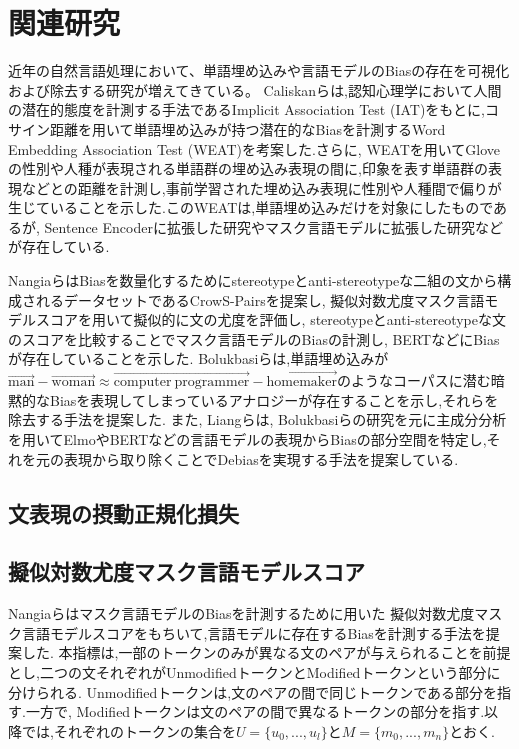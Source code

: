 \documentclass[
  platex, dvipdfmx %
]{nlp2021}
\begin{document}
\section{関連研究}
近年の自然言語処理において、単語埋め込みや言語モデルのBiasの存在を可視化および除去する研究が増えてきている。
Caliskanら\cite{caliskan2017}は,認知心理学において人間の潜在的態度を計測する手法であるImplicit Association Test (IAT)\cite{Greenwald98measuringindividual}をもとに,コサイン距離を用いて単語埋め込みが持つ潜在的なBiasを計測するWord Embedding Association Test (WEAT)を考案した.さらに, WEATを用いてGlove\cite{pennington2014glove}の性別や人種が表現される単語群の埋め込み表現の間に,印象を表す単語群の表現などとの距離を計測し,事前学習された埋め込み表現に性別や人種間で偏りが生じていることを示した.このWEATは,単語埋め込みだけを対象にしたものであるが, Sentence Encoderに拡張した研究\cite{may-etal-2019-measuring}やマスク言語モデルに拡張した研究\cite{kurita2019measuring}などが存在している.

Nangiaら\cite{nangia2020crows}はBiasを数量化するためにstereotypeとanti-stereotypeな二組の文から構成されるデータセットであるCrowS-Pairsを提案し, 擬似対数尤度マスク言語モデルスコア\cite{salazar-etal-2020-masked}を用いて擬似的に文の尤度を評価し,  stereotypeとanti-stereotypeな文のスコアを比較することでマスク言語モデルのBiasの計測し, BERTなどにBiasが存在していることを示した.
Bolukbasiら\cite{bolukbasi2016man}は,単語埋め込みが$\overrightarrow{\mathrm{man}}-\overrightarrow{\mathrm{woman}} \approx \overrightarrow{\mathrm{computer\ programmer}}-\overrightarrow{\mathrm{homemaker}}$のようなコーパスに潜む暗黙的なBiasを表現してしまっているアナロジーが存在することを示し,それらを除去する手法を提案した.
また, Liangら\cite{liang-etal-2020-towards}は, Bolukbasiらの研究を元に主成分分析を用いてElmoやBERTなどの言語モデルの表現からBiasの部分空間を特定し,それを元の表現から取り除くことでDebiasを実現する手法を提案している.

\subsection{文表現の摂動正規化損失}

\subsection{擬似対数尤度マスク言語モデルスコア}
Nangiaら\cite{nangia2020crows}はマスク言語モデルのBiasを計測するために用いた 擬似対数尤度マスク言語モデルスコア\cite{salazar-etal-2020-masked}をもちいて,言語モデルに存在するBiasを計測する手法を提案した.
本指標は,一部のトークンのみが異なる文のペアが与えられることを前提とし,二つの文それぞれがUnmodifiedトークンとModifiedトークンという部分に分けられる. Unmodifiedトークンは,文のペアの間で同じトークンである部分を指す.一方で, Modifiedトークンは文のペアの間で異なるトークンの部分を指す.以降では,それぞれのトークンの集合を$U = \{u_0, ..., u_l\}$と$M = \{m_0, ..., m_n\}$とおく.
\end{document}
